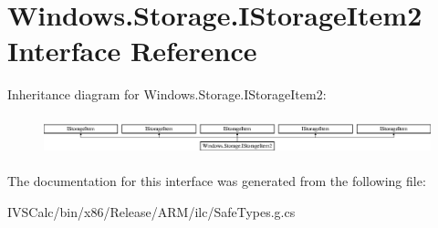 \hypertarget{interface_windows_1_1_storage_1_1_i_storage_item2}{}\section{Windows.\+Storage.\+I\+Storage\+Item2 Interface Reference}
\label{interface_windows_1_1_storage_1_1_i_storage_item2}
Inheritance diagram for Windows.\+Storage.\+I\+Storage\+Item2\+:\begin{figure}[H]
\begin{center}
\leavevmode
\includegraphics[height=1.131313cm]{interface_windows_1_1_storage_1_1_i_storage_item2}
\end{center}
\end{figure}


The documentation for this interface was generated from the following file\+:\begin{DoxyCompactItemize}
\item 
I\+V\+S\+Calc/bin/x86/\+Release/\+A\+R\+M/ilc/Safe\+Types.\+g.\+cs\end{DoxyCompactItemize}
